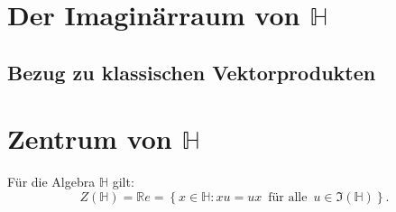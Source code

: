 \documentclass[aspectratio=169]{beamer}
\newcommand{\Ham}{\ensuremath{\mathbb{H}}{ }}
\newcommand{\R}{\ensuremath{\mathbb{R}}{ }}
\begin{document}
    \section{Der Imaginärraum von \(\mathbb{H}\)}
    \subsection{Bezug zu klassischen Vektorprodukten}

    \section{Zentrum von \(\mathbb{H}\)}
    \begin{frame}
        \begin{theorem}
            Für die Algebra \Ham gilt:
            \[
                Z \left( \Ham \right) = \R e = \left\{ x \in \Ham \colon xu = ux \,\text{ für alle }\, u \in \Im \left( \Ham \right) \right\}
            .\]
        \end{theorem}
    \end{frame}
\end{document}
